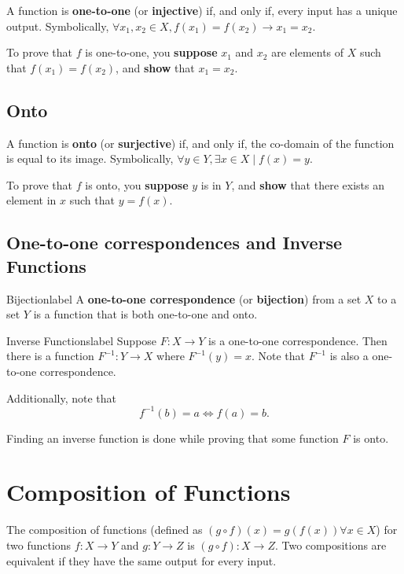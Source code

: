 \documentclass[a4paper]{report}
\begin{document}
A function is \textbf{one-to-one} (or \textbf{injective}) if, and only if, every input has a unique 
output. Symbolically, $\forall x_1, x_2 \in X, f(x_1)=f(x_2) \to x_1 = x_2$.

To prove that $f$ is one-to-one, you \textbf{suppose} $x_1$ and $x_2$ are elements of $X$ such that
$f(x_1)=f(x_2)$, and \textbf{show} that $x_1=x_2$.

\subsection{Onto}

A function is \textbf{onto} (or \textbf{surjective}) if, and only if, the co-domain of the function
is equal to its image. Symbolically, $\forall y \in Y, \exists x \in X  \mid f(x) = y$.

To prove that $f$ is onto, you \textbf{suppose} $y$ is in $Y$, and \textbf{show} that
there exists an element in $x$ such that $y = f(x)$.

\subsection{One-to-one correspondences and Inverse Functions}

\begin{definition}{Bijection}{label}
    A \textbf{one-to-one correspondence} (or \textbf{bijection}) from a set $X$ to a set $Y$ is
    a function that is both one-to-one and onto.
\end{definition}

\begin{theorem}{Inverse Functions}{label}
    Suppose $F: X \to Y$ is a one-to-one correspondence. Then there is a function $F^{-1}: Y \to X$
    where $F^{-1}(y)=x$. Note that $F^{-1}$ is also a one-to-one correspondence.

    Additionally, note that \[
        f^{-1}(b) = a \Leftrightarrow f(a) = b
    .\] 
\end{theorem}

Finding an inverse function is done while proving that some function $F$ is onto.

\section{Composition of Functions}

The composition of functions (defined as $(g \circ f)(x) = g(f(x)) \forall x \in X$) for two
functions $f: X \to Y$ and $g: Y \to Z$ is $(g \circ f): X \to Z$.
Two compositions are equivalent if they have the same output for every input.
\end{document}
